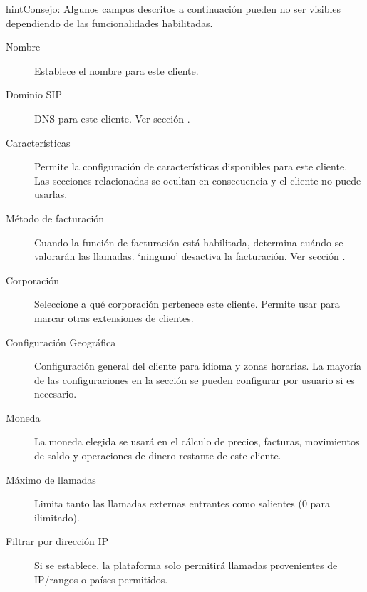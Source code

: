 \documentclass[letterpaper,10pt,spanish]{sphinxmanual}
\begin{document}
\begin{notice}{hint}{Consejo:}
Algunos campos descritos a continuación pueden no ser visibles dependiendo de las funcionalidades habilitadas.
\begin{description}
\item[{Nombre}] \leavevmode
Establece el nombre para este cliente.

\item[{Dominio SIP}] \leavevmode
DNS para este cliente. Ver sección {\hyperref[getting_started/internal_calls/brand_portal:client\string-sip\string-domain]{}}.

\item[{Características}] \leavevmode
Permite la configuración de características disponibles para este cliente. Las secciones relacionadas se ocultan en consecuencia y el cliente no puede usarlas.

\item[{Método de facturación}] \leavevmode
Cuando la función de facturación está habilitada, determina cuándo se valorarán las llamadas. `ninguno' desactiva la facturación. Ver sección {\hyperref[administration_portal/brand/billing/index:billing]{}}.

\item[{Corporación}] \leavevmode
Seleccione a qué corporación pertenece este cliente. Permite usar {\hyperref[administration_portal/client/vpbx/routing_endpoints/friends/internal_friends:internal\string-friends]{}} para marcar otras extensiones de clientes.

\item[{Configuración Geográfica}] \leavevmode
Configuración general del cliente para idioma y zonas horarias. La mayoría de las configuraciones en la sección se pueden configurar por usuario si es necesario.

\item[{Moneda}] \leavevmode
La moneda elegida se usará en el cálculo de precios, facturas, movimientos de saldo y operaciones de dinero restante de este cliente.

\item[{Máximo de llamadas}] \leavevmode
Limita tanto las llamadas externas entrantes como salientes (0 para ilimitado).

\item[{Filtrar por dirección IP}] \leavevmode
Si se establece, la plataforma solo permitirá llamadas provenientes de IP/rangos o países permitidos.


\end{description}
\end{notice}
\end{document}
